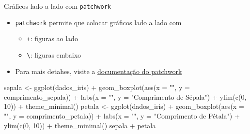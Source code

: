 \documentclass[
  10pt,
  ignorenonframetext,
]{beamer}
\newenvironment{Shaded}{}{}
\newcommand{\DataTypeTok}[1]{#1}
\newcommand{\DecValTok}[1]{#1}
\newcommand{\KeywordTok}[1]{\textcolor[rgb]{0.00,0.00,1.00}{#1}}
\newcommand{\NormalTok}[1]{#1}
\newcommand{\OperatorTok}[1]{#1}
\newcommand{\StringTok}[1]{\textcolor[rgb]{0.00,0.50,0.50}{#1}}
\providecommand{\tightlist}{%
  \setlength{\itemsep}{0pt}\setlength{\parskip}{0pt}}
\begin{document}
\begin{frame}[fragile]{Gráficos lado a lado com \texttt{patchwork}}
\protect\hypertarget{gruxe1ficos-lado-a-lado-com-patchwork}{}
\begin{itemize}
\tightlist
\item
  \texttt{patchwork} permite que colocar gráficos lado a lado com

  \begin{itemize}
  \tightlist
  \item
    \texttt{+}: figuras ao lado
  \item
    \texttt{\textbackslash{}}: figuras embaixo
  \end{itemize}
\item
  Para mais detahes, visite a
  \href{https://patchwork.data-imaginist.com/articles/patchwork.html}{documentação
  do patchwork}
\end{itemize}

\begin{Shaded}
\begin{Highlighting}[]
\NormalTok{sepala \textless{}{-}}\StringTok{ }\KeywordTok{ggplot}\NormalTok{(dados\_iris) }\OperatorTok{+}
\StringTok{  }\KeywordTok{geom\_boxplot}\NormalTok{(}\KeywordTok{aes}\NormalTok{(}\DataTypeTok{x =} \StringTok{""}\NormalTok{, }\DataTypeTok{y =}\NormalTok{ comprimento\_sepala)) }\OperatorTok{+}
\StringTok{  }\KeywordTok{labs}\NormalTok{(}\DataTypeTok{x =} \StringTok{""}\NormalTok{, }\DataTypeTok{y =} \StringTok{"Comprimento de Sépala"}\NormalTok{) }\OperatorTok{+}
\StringTok{  }\KeywordTok{ylim}\NormalTok{(}\KeywordTok{c}\NormalTok{(}\DecValTok{0}\NormalTok{, }\DecValTok{10}\NormalTok{)) }\OperatorTok{+}
\StringTok{  }\KeywordTok{theme\_minimal}\NormalTok{()}
\NormalTok{petala \textless{}{-}}\StringTok{ }\KeywordTok{ggplot}\NormalTok{(dados\_iris) }\OperatorTok{+}
\StringTok{  }\KeywordTok{geom\_boxplot}\NormalTok{(}\KeywordTok{aes}\NormalTok{(}\DataTypeTok{x =} \StringTok{""}\NormalTok{, }\DataTypeTok{y =}\NormalTok{ comprimento\_petala)) }\OperatorTok{+}
\StringTok{  }\KeywordTok{labs}\NormalTok{(}\DataTypeTok{x =} \StringTok{""}\NormalTok{, }\DataTypeTok{y =} \StringTok{"Comprimento de Pétala"}\NormalTok{) }\OperatorTok{+}
\StringTok{  }\KeywordTok{ylim}\NormalTok{(}\KeywordTok{c}\NormalTok{(}\DecValTok{0}\NormalTok{, }\DecValTok{10}\NormalTok{)) }\OperatorTok{+}
\StringTok{  }\KeywordTok{theme\_minimal}\NormalTok{()}
\NormalTok{sepala }\OperatorTok{+}\StringTok{ }\NormalTok{petala}
\end{Highlighting}
\end{Shaded}
\end{frame}
\end{document}
